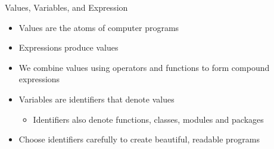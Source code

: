\documentclass[smaller, aspectratio=1610]{beamer}
\begin{document}
\begin{frame}[label={sec:orgefc792b}]{Values, Variables, and Expression}
\begin{itemize}
\item Values are the atoms of computer programs
\item Expressions produce values
\item We combine values using operators and functions to form compound expressions
\item Variables are identifiers that denote values
\begin{itemize}
\item Identifiers also denote functions, classes, modules and packages
\end{itemize}
\item Choose identifiers carefully to create beautiful, readable programs
\end{itemize}
\end{frame}
\end{document}

